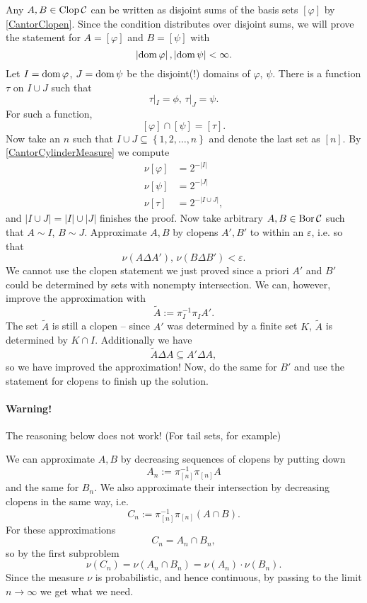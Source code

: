 Any \( A, B \in \operatorname{Clop} \mathcal{C} \) can be written as disjoint sums of the basis sets \( \left[ \varphi \right] \) by \ref{CantorClopen}. Since the condition distributes over disjoint sums, we will prove the statement for \( A = \left[ \varphi \right] \) and \( B = \left[ \psi \right] \) with
\[ 
    \left| \operatorname{dom} \varphi \right|, \left| \operatorname{dom} \psi \right| < \infty.
\]
Let \( I = \operatorname{dom} \varphi \), \( J = \operatorname{dom} \psi \) be the disjoint(!) domains of \( \varphi \), \( \psi \). There is a function \( \tau \) on \( I \cup J \) such that
\[ 
    \tau |_I = \phi,\, \tau |_J = \psi.
\]
For such a function,
\[ 
    \left[ \varphi \right] \cap \left[ \psi \right] = \left[ \tau \right]. 
\]
Now take an \( n \) such that \( I \cup J \subseteq \left\{ 1, 2, \ldots, n \right\} \) and denote the last set as \( \left[ n \right] \). By \ref{CantorCylinderMeasure} we compute
\begin{align*}
    \nu \left[ \varphi \right] &= 2^{-|I|} \\
    \nu \left[ \psi \right] &= 2^{-|J|} \\
    \nu \left[ \tau \right] &= 2^{-|I \cup J|},
\end{align*}
and \( |I \cup J| = |I| \cup |J|  \) finishes the proof. Now take arbitrary \( A, B \in \operatorname{Bor} \mathcal{C} \) such that \( A \sim I \), \( B \sim J \). Approximate \( A, B \) by clopens \( A', B' \) to within an \(\varepsilon \), i.e. so that
\[ 
    \nu (A \Delta A'),\, \nu (B \Delta B') <\varepsilon. 
\]
We cannot use the clopen statement we just proved since a priori \( A' \) and \( B' \) could be determined by sets with nonempty intersection. We can, however, improve the approximation with
\[ 
    \widetilde{A} := \pi_I^{-1} \pi_I A'.
\]
The set \( \widetilde{A} \) is still a clopen -- since \( A' \) was determined by a finite set \( K \), \( \widetilde{A} \) is determined by \( K \cap I \). Additionally we have
\[ 
    \widetilde{A} \Delta A \subseteq A' \Delta A, 
\]
so we have improved the approximation! Now, do the same for \( B' \) and use the statement for clopens to finish up the solution.

\paragraph{Warning!} The reasoning below does not work! (For tail sets, for example)

We can approximate \( A, B \) by decreasing sequences of clopens by putting down
\[
    A_n := \pi_{[n]}^{-1} \pi_{[n]} A
\]
and the same for \( B_n \). We also approximate their intersection by decreasing clopens in the same way, i.e.
\[ 
    C_n := \pi_{[n]}^{-1} \pi_{[n]} (A \cap B).
\]
For these approximations
\[ 
    C_n = A_n \cap B_n, 
\]
so by the first subproblem
\[ 
    \nu(C_n) = \nu(A_n \cap B_n) = \nu(A_n) \cdot \nu(B_n).
\]
Since the measure \( \nu \) is probabilistic, and hence continuous, by passing to the limit \( n \to \infty \) we get what we need.

